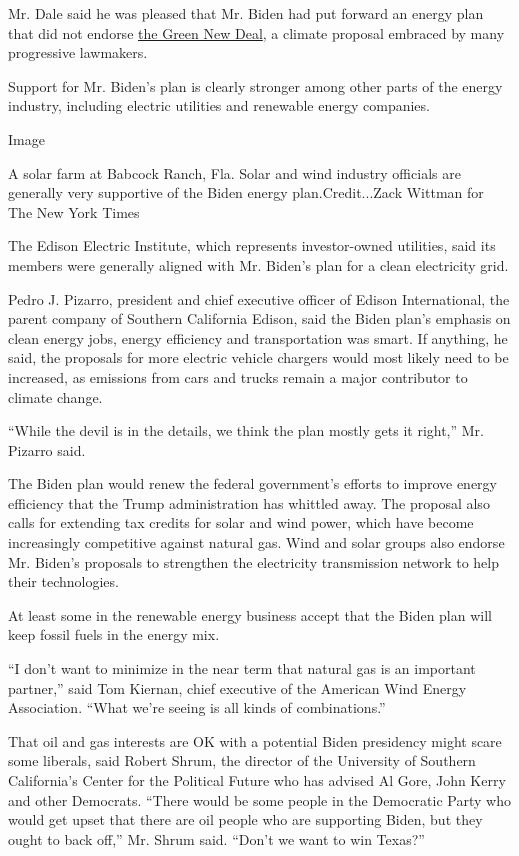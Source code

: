 Mr. Dale said he was pleased that Mr. Biden had put forward an energy
plan that did not endorse
\href{https://www.nytimes3xbfgragh.onion/2019/02/21/climate/green-new-deal-questions-answers.html}{the
Green New Deal}, a climate proposal embraced by many progressive
lawmakers.

Support for Mr. Biden's plan is clearly stronger among other parts of
the energy industry, including electric utilities and renewable energy
companies.

Image

A solar farm at Babcock Ranch, Fla. Solar and wind industry officials
are generally very supportive of the Biden energy plan.Credit...Zack
Wittman for The New York Times

The Edison Electric Institute, which represents investor-owned
utilities, said its members were generally aligned with Mr. Biden's plan
for a clean electricity grid.

Pedro J. Pizarro, president and chief executive officer of Edison
International, the parent company of Southern California Edison, said
the Biden plan's emphasis on clean energy jobs, energy efficiency and
transportation was smart. If anything, he said, the proposals for more
electric vehicle chargers would most likely need to be increased, as
emissions from cars and trucks remain a major contributor to climate
change.

``While the devil is in the details, we think the plan mostly gets it
right,'' Mr. Pizarro said.

The Biden plan would renew the federal government's efforts to improve
energy efficiency that the Trump administration has whittled away. The
proposal also calls for extending tax credits for solar and wind power,
which have become increasingly competitive against natural gas. Wind and
solar groups also endorse Mr. Biden's proposals to strengthen the
electricity transmission network to help their technologies.

At least some in the renewable energy business accept that the Biden
plan will keep fossil fuels in the energy mix.

``I don't want to minimize in the near term that natural gas is an
important partner,'' said Tom Kiernan, chief executive of the American
Wind Energy Association. ``What we're seeing is all kinds of
combinations.''

That oil and gas interests are OK with a potential Biden presidency
might scare some liberals, said Robert Shrum, the director of the
University of Southern California's Center for the Political Future who
has advised Al Gore, John Kerry and other Democrats. ``There would be
some people in the Democratic Party who would get upset that there are
oil people who are supporting Biden, but they ought to back off,'' Mr.
Shrum said. ``Don't we want to win Texas?''

